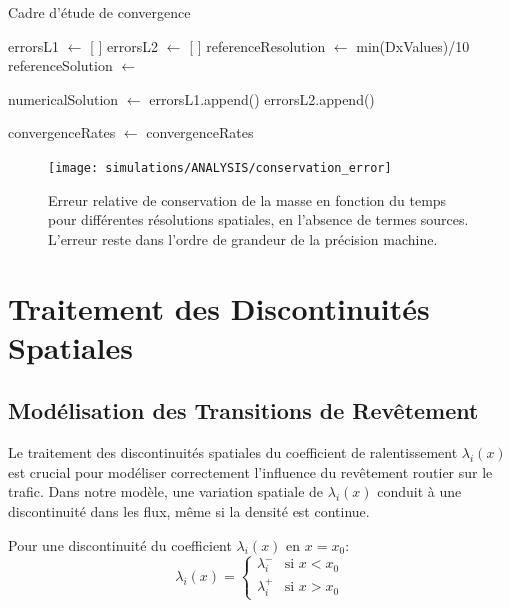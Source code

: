 \begin{algorithm}[htbp]
\caption{Cadre d'étude de convergence}
\begin{algorithmic}[1]
    \State errorsL1 $\gets$ [ ]
    \State errorsL2 $\gets$ [ ]
    \State referenceResolution $\gets$ min(DxValues)/10
    \State referenceSolution $\gets$ 
    
        \State numericalSolution $\gets$ 
        \State errorsL1.append()
        \State errorsL2.append()
    \EndFor
    
    \State convergenceRates $\gets$ 
    \State \Return convergenceRates
\EndFunction
\end{algorithmic}
\label{alg:convergence_study}
\end{algorithm}

\begin{figure}[htbp]
\centering
\texttt{[image: simulations/ANALYSIS/conservation\_error]}
\caption{Erreur relative de conservation de la masse en fonction du temps pour différentes résolutions spatiales, en l'absence de termes sources. L'erreur reste dans l'ordre de grandeur de la précision machine.}
\label{fig:conservation}
\end{figure}

\section{Traitement des Discontinuités Spatiales}
\label{sec:traitement_discontinuites}

\subsection{Modélisation des Transitions de Revêtement}
\label{subsec:transitions_revetement}

Le traitement des discontinuités spatiales du coefficient de ralentissement $\lambda_i(x)$ est crucial pour modéliser correctement l'influence du revêtement routier sur le trafic. Dans notre modèle, une variation spatiale de $\lambda_i(x)$ conduit à une discontinuité dans les flux, même si la densité est continue.

Pour une discontinuité du coefficient $\lambda_i(x)$ en $x=x_0$:
\begin{equation}
\lambda_i(x) = 
\begin{cases}
\lambda_i^- & \text{si } x < x_0 \\
\lambda_i^+ & \text{si } x > x_0
\end{cases}
\end{equation}


